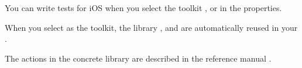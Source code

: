 You can write tests for iOS \gdauts{} when you select the toolkit ,  or  in the \gdproject{} properties.

When you select  as the \gdproject{} toolkit, the library \gdprojects{} ,   and  are automatically reused in your \gdproject{}. 


The actions in the concrete library are described in the reference manual .
